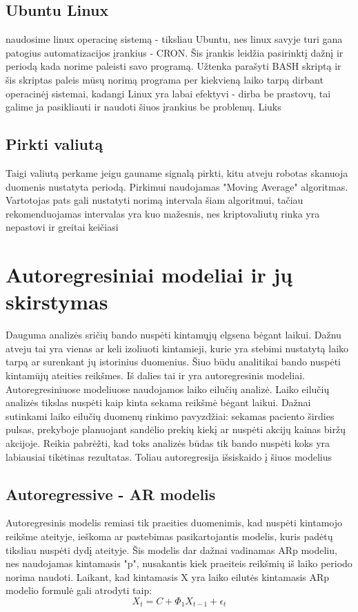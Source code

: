 \documentclass{VUMIFInfKursinis}
\begin{document}
\subsection{Ubuntu Linux}
naudosime linux operacinę sistemą - tiksliau Ubuntu, nes linux savyje turi gana patogius automatizacijos įrankius - CRON. Šis įrankis leidžia pasirinktį dažnį 
ir periodą kada norime paleisti savo programą. Užtenka parašyti BASH skriptą 
ir šis skriptas paleis mūsų norimą programa per kiekvieną laiko tarpą dirbant
operacinėj sistemai, kadangi Linux yra labai efektyvi - dirba be prastovų,
tai galime ja pasikliauti ir naudoti šiuos įrankius be problemų. Liuks
\subsection{Pirkti valiutą}
Taigi valiutą perkame jeigu gauname signalą pirkti, kitu atveju robotas skanuoja duomenis nustatyta periodą. Pirkimui naudojamas "Moving Average" algoritmas. 
Vartotojas pats gali nustatyti norimą intervala šiam algoritmui, tačiau rekomenduojamas intervalas yra kuo mažesnis, nes kriptovaliutų rinka 
yra nepastovi ir greitai keičiasi 

\section{Autoregresiniai modeliai ir jų skirstymas}
Dauguma analizės sričių bando nuspėti kintamųjų elgsena bėgant laikui. Dažnu atveju tai yra vienas ar keli izoliuoti kintamieji, kurie yra stebimi nustatytą laiko
tarpą ar surenkant jų istorinius duomenius. Šiuo būdu analitikai bando nuspėti kintamūjų ateities reikšmes. Iš dalies tai ir yra autoregresinis modeliai. 
Autoregresiniuose modeliuose naudojamos laiko eilučių analizė. Laiko eilučių analizės tikslas nuspėti kaip kinta sekama reikšmė bėgant laikui. Dažnai sutinkami laiko eilučių
duomenų rinkimo pavyzdžiai: sekamas paciento širdies pulsas, prekyboje planuojant sandėlio prekių kiekį ar nuspėti akcijų kainas biržų akcijoje.
Reikia pabrėžti, kad toks analizės būdas tik bando nuspėti koks yra labiausiai tikėtinas rezultatas. Toliau autoregresija išsiskaido į šiuos modelius
\subsection{Autoregressive - AR modelis}
Autoregresinis modelis remiasi tik praeities duomenimis, kad nuspėti kintamojo reikšme ateityje, ieškoma ar pastebimas pasikartojantis modelis, kuris padėtų tiksliau nuspėti dydį ateityje.
Šis modelis dar dažnai vadinamas ARp modeliu, nes naudojamas kintamasis "p", nusakantis kiek praeiteis reikšmių iš laiko periodo norima naudoti.
Laikant, kad kintamasis X yra laiko eilutės kintamasis ARp modelio formulė gali atrodyti taip: \[X_{t} = C + \Phi _{1}X_{t-1}+\epsilon_{t} \]
\end{document}
